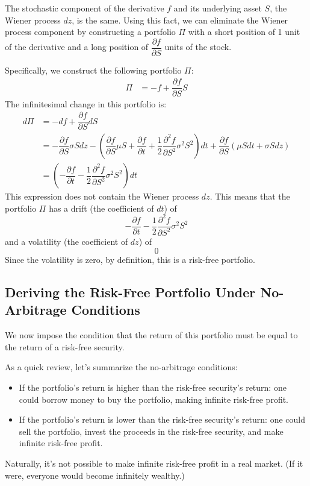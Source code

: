 \documentclass[uplatex]{jsarticle}
\begin{document}
\bigskip

The stochastic component of the derivative $f$ and its underlying asset $S$, the Wiener process $dz$, is the same. Using this fact, we can eliminate the Wiener process component by constructing a portfolio $\Pi$ with a short position of 1 unit of the derivative and a long position of $\dfrac{\partial f}{\partial S}$ units of the stock.

Specifically, we construct the following portfolio $\Pi$:
\begin{align}
	\Pi & = - f + \dfrac{\partial f}{\partial S} S
\end{align}
The infinitesimal change in this portfolio is:
\begin{align}
	d \Pi & = - df + \dfrac{\partial f}{\partial S} dS\\
	& = - \dfrac{\partial f}{\partial S} \sigma S dz - \left( \dfrac{\partial f}{\partial S} \mu S + \dfrac{\partial f}{\partial t} + \dfrac{1}{2} \dfrac{\partial^{2} f}{\partial S^{2}} \sigma^{2} S^{2} \right) dt + \dfrac{\partial f}{\partial S} (\mu S dt + \sigma S dz) \\
	& = \left( - \dfrac{\partial f}{\partial t} - \dfrac{1}{2} \dfrac{\partial^{2} f}{\partial S^{2}} \sigma^{2} S^{2} \right) dt
\end{align}
This expression does not contain the Wiener process $dz$. This means that the portfolio $\Pi$ has a drift (the coefficient of $dt$) of
$$
	- \dfrac{\partial f}{\partial t} - \dfrac{1}{2} \dfrac{\partial^{2} f}{\partial S^{2}} \sigma^{2} S^{2}
$$
and a volatility (the coefficient of $dz$) of
$$
	0
$$
Since the volatility is zero, by definition, this is a risk-free portfolio.

\subsection{Deriving the Risk-Free Portfolio Under No-Arbitrage Conditions}

We now impose the condition that the return of this portfolio must be equal to the return of a risk-free security.

As a quick review, let's summarize the no-arbitrage conditions:
\begin{itemize}
	\item If the portfolio's return is higher than the risk-free security's return: one could borrow money to buy the portfolio, making infinite risk-free profit.
	\item If the portfolio's return is lower than the risk-free security's return: one could sell the portfolio, invest the proceeds in the risk-free security, and make infinite risk-free profit.
\end{itemize}
Naturally, it's not possible to make infinite risk-free profit in a real market. (If it were, everyone would become infinitely wealthy.)
\end{document}
